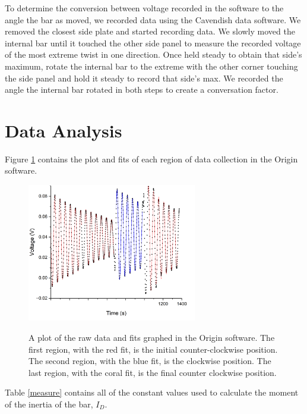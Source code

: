 \documentclass[aps,prl,10pt,twocolumn,floatfix]{revtex4-2}
\begin{document}
To determine the conversion between voltage recorded in the software to the angle the bar as moved, we recorded data using the Cavendish data software.
We removed the closest side plate and started recording data.
We slowly moved the internal bar until it touched the other side panel to measure the recorded voltage of the most extreme twist in one direction.
Once held steady to obtain that side's maximum, rotate the internal bar to the extreme with the other corner touching the side panel and hold it steady to record that side's max.
We recorded the angle the internal bar rotated in both steps to create a conversation factor. 

\section{Data Analysis}

Figure \ref{dataOrigin} contains the plot and fits of each region of data collection in the Origin software. 

\begin{figure}
\centering
\includegraphics[width=20em]{dataOrigin.png}   
\label{dataOrigin}
\caption{A plot of the raw data and fits graphed in the Origin software. The first region, with the red fit, is the initial counter-clockwise position. The second region, with the blue fit, is the clockwise position. The last region, with the coral fit, is the final counter clockwise position.}
\end{figure}

Table \ref{measure} contains all of the constant values used to calculate the moment of the inertia of the bar, $I_D$.
\end{document}
